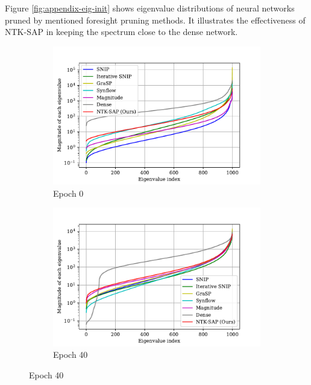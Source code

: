 \documentclass{article} %
\begin{document}
Figure \ref{fig:appendix-eig-init} shows eigenvalue distributions of neural networks pruned by mentioned foresight pruning methods. It illustrates the effectiveness of NTK-SAP in keeping the spectrum close to the dense network.

\begin{figure}
  \centering
  \begin{subfigure}[b]{.49\textwidth}
    \includegraphics[width=\textwidth]{plots/ICLR_rebuttal/compare_w_dense_abs_epoch0.pdf}
  \caption{\small Epoch 0}
  \label{fig:appendix-eig-during-epoch0}
  \end{subfigure}
  \begin{subfigure}[b]{.49\textwidth}
    \includegraphics[width=\textwidth]{plots/ICLR_rebuttal/compare_w_dense_abs_epoch40.pdf}
   \caption{\small Epoch 40 }
   \label{fig:appendix-eig-during-epoch40}
  \end{subfigure}

\end{figure}
\end{document}
